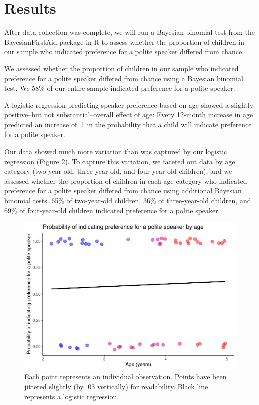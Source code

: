 \documentclass[
  english,
  man,floatsintext]{apa6}
\begin{document}
\hypertarget{results}{%
\section{Results}\label{results}}

After data collection was complete, we will run a Bayesian binomial test from the BayesianFirstAid package in R to assess whether the proportion of children in our sample who indicated preference for a polite speaker differed from chance.

We assessed whether the proportion of children in our sample who indicated preference for a polite speaker differed from chance using a Bayesian binomial test. We 58\% of our entire sample indicated preference for a polite speaker.

A logistic regression predicting speaker preference based on age showed a slightly positive--but not substantial--overall effect of age: Every 12-month increase in age predicted an increase of .1 in the probability that a child will indicate preference for a polite speaker.

Our data showed much more variation than was captured by our logistic regression (Figure 2). To capture this variation, we faceted out data by age category (two-year-old, three-year-old, and four-year-old children), and we assessed whether the proportion of children in each age category who indicated preference for a polite speaker differed from chance using additional Bayesian binomial tests. 65\% of two-year-old children, 36\% of three-year-old children, and 69\% of four-year-old children indicated preference for a polite speaker.

\begin{figure}
\centering
\includegraphics{writeup_files/figure-latex/unnamed-chunk-1-1.pdf}
\caption{\label{fig:unnamed-chunk-1}Each point represents an individual observation. Points have been jittered slightly (by .03 vertically) for readability. Black line represents a logistic regression.}
\end{figure}
\end{document}
